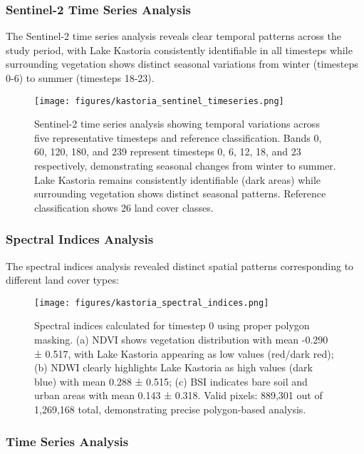 \documentclass[a4paper,12pt]{article}
\begin{document}
\subsubsection{Sentinel-2 Time Series Analysis}

The Sentinel-2 time series analysis reveals clear temporal patterns across the
study period, with Lake Kastoria consistently identifiable in all timesteps
while surrounding vegetation shows distinct seasonal variations from winter
(timesteps 0-6) to summer (timesteps 18-23).

\begin{figure}[H]
    \centering
    \texttt{[image: figures/kastoria\_sentinel\_timeseries.png]}
    \caption{Sentinel-2 time series analysis showing temporal variations across five representative timesteps and reference classification. Bands 0, 60, 120, 180, and 239 represent timesteps 0, 6, 12, 18, and 23 respectively, demonstrating seasonal changes from winter to summer. Lake Kastoria remains consistently identifiable (dark areas) while surrounding vegetation shows distinct seasonal patterns. Reference classification shows 26 land cover classes.}
    \label{fig:sentinel_timeseries}
\end{figure}

\subsubsection{Spectral Indices Analysis}

The spectral indices analysis revealed distinct spatial patterns corresponding
to different land cover types:

\begin{figure}[H]
    \centering
    \texttt{[image: figures/kastoria\_spectral\_indices.png]}
    \caption{Spectral indices calculated for timestep 0 using proper polygon masking. (a) NDVI shows vegetation distribution with mean -0.290 ± 0.517, with Lake Kastoria appearing as low values (red/dark red); (b) NDWI clearly highlights Lake Kastoria as high values (dark blue) with mean 0.288 ± 0.515; (c) BSI indicates bare soil and urban areas with mean 0.143 ± 0.318. Valid pixels: 889,301 out of 1,269,168 total, demonstrating precise polygon-based analysis.}
    \label{fig:spectral_indices}
\end{figure}

\subsubsection{Time Series Analysis}
\end{document}
